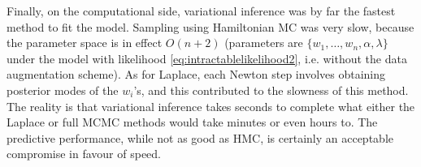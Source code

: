 Finally, on the computational side, variational inference was by far the fastest method to fit the model.
Sampling using Hamiltonian MC was very slow, because the parameter space is in effect $O(n + 2)$ (parameters are $\{w_1,\dots,w_n,\alpha,\lambda\}$ under the model with likelihood \cref{eq:intractablelikelihood2}, i.e. without the data augmentation scheme).
As for Laplace, each Newton step involves obtaining posterior modes of the $w_i$'s, and this contributed to the slowness of this method.
The reality is that variational inference takes seconds to complete what either the Laplace or full MCMC methods would take minutes or even hours to.
The predictive performance, while not as good as HMC, is certainly an acceptable compromise in favour of speed.
\vspace{-1em}

